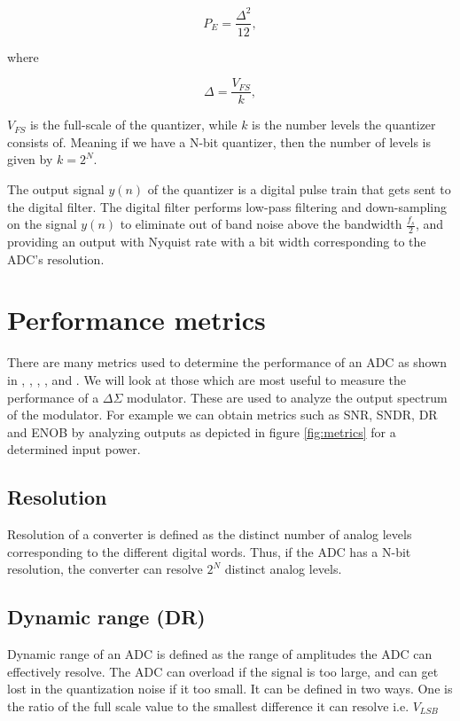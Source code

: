 \begin{equation}
    P_E = \frac{\Delta^2}{12},
\end{equation}

where 

\begin{equation}
    \Delta = \frac{V_{FS}}{k},
\end{equation}

$V_{FS}$ is the full-scale of the quantizer, while $k$ is the number levels the quantizer consists of. Meaning if we have a N-bit quantizer, then the number of levels is given by $k = 2^N$. 

The output signal $y(n)$ of the quantizer is a digital pulse train that gets sent to the digital filter. The digital filter performs low-pass filtering and down-sampling on the signal $y(n)$ to eliminate out of band noise above the bandwidth $\frac{f_s}{2}$, and providing an output with Nyquist rate with a bit width corresponding to the ADC's resolution. 

\section{Performance metrics}

There are many metrics used to determine the performance of an ADC as shown in \cite{Allen}, \cite{Johns}, \cite{Razavi}, \cite{Barker}, \cite{Malo} and \cite{Plass}. We will look at those which are most useful to measure the performance of a $\Delta\Sigma$ modulator. These are used to analyze the output spectrum of the modulator. For example we can obtain metrics such as SNR, SNDR, DR and ENOB by analyzing outputs as depicted in figure \ref{fig:metrics} for a determined input power. 

\subsection{Resolution}
Resolution of a converter is defined as the distinct number of analog levels corresponding to the different digital words. Thus, if the ADC has a N-bit resolution, the converter can resolve $2^N$ distinct analog levels.

\subsection{Dynamic range (DR)}
Dynamic range of an ADC is defined as the range of amplitudes the ADC can effectively resolve. The ADC can overload if the signal is too large, and can get lost in the quantization noise if it too small. It can be defined in two ways. One is the ratio of the full scale value to the smallest difference it can resolve i.e. $V_{LSB}$

